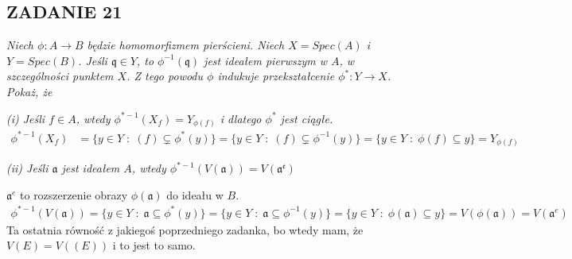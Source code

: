 \documentclass{article}
\begin{document}
\subsection*{ZADANIE 21}
\emph{\color{pink}Niech $\phi:A\to B$ będzie homomorfizmem pierścieni. Niech $X=Spec(A)$ i $Y=Spec(B)$. Jeśli $\mathfrak{q}\in Y$, to $\phi^{-1}(\mathfrak{q})$ jest ideałem pierwszym w $A$, w szczególności punktem $X$. Z tego powodu $\phi$ indukuje przekształcenie $\phi^*:Y\to X$. Pokaż, że}

\emph{\color{pink}(i) Jeśli $f\in A$, wtedy $\phi^{*-1}(X_f)=Y_{\phi(f)}$ i dlatego $\phi^*$ jest ciągłe.}
\begin{align*}
    \phi^{*-1}(X_f)&=\{y\in Y\;:\;(f)\subsetneq\phi^*(y)\}=\{y\in Y\;:\;(f)\subsetneq\phi^{-1}(y)\}=\{y\in Y\;:\;\phi(f)\subseteq y\}=Y_{\phi(f)}
\end{align*}

\emph{\color{pink}(ii) Jeśli $\mathfrak{a}$ jest ideałem $A$, wtedy $\phi^{*-1}(V(\mathfrak{a}))=V(\mathfrak{a^e})$ }

$\mathfrak{a}^e$ to rozszerzenie obrazy $\phi(\mathfrak{a})$ do ideału w $B$.
\begin{align*}
    \phi^{*-1}(V(\mathfrak{a}))=\{y\in Y\;:\;\mathfrak{a}\subseteq \phi^*(y)\}=\{y\in Y\;:\;\mathfrak{a}\subseteq\phi^{-1}(y)\}=\{y\in Y\;:\;\phi(\mathfrak{a})\subseteq y\}=V(\phi(\mathfrak{a}))=V(\mathfrak{a}^e)
\end{align*}
Ta ostatnia równość z jakiegoś poprzedniego zadanka, bo wtedy mam, że $V(E)=V((E))$ i to jest to samo.
\end{document}
